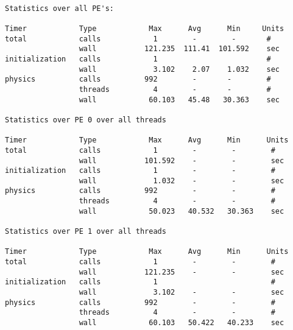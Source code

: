 {\tt
\begin{verbatim}
Statistics over all PE's:

Timer            Type            Max      Avg      Min     Units
total            calls            1        -        -       #
                 wall           121.235  111.41  101.592    sec
initialization   calls            1                         #
                 wall             3.102    2.07    1.032    sec
physics          calls          992        -       -        #
                 threads          4        -       -        #
                 wall            60.103   45.48   30.363    sec

Statistics over PE 0 over all threads

Timer            Type            Max      Avg      Min      Units
total            calls            1        -        -        #
                 wall           101.592    -        -        sec
initialization   calls            1        -        -        #
                 wall             1.032    -        -        sec
physics          calls          992        -        -        #
                 threads          4        -        -        #
                 wall            50.023   40.532   30.363    sec

Statistics over PE 1 over all threads

Timer            Type            Max      Avg      Min      Units
total            calls            1        -        -        #
                 wall           121.235    -        -        sec
initialization   calls            1                          #
                 wall             3.102    -        -        sec
physics          calls          992        -        -        #
                 threads          4        -        -        #
                 wall            60.103   50.422   40.233    sec
\end{verbatim}
}

